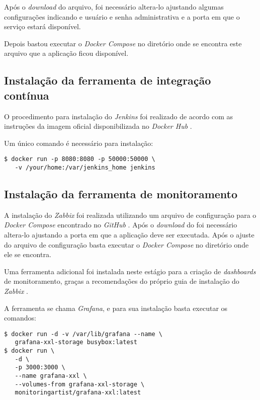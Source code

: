 \documentclass[
	12pt,				%
	openright,			%
	oneside,			%
	a4paper,			%
	english,			%
	french,				%
	spanish,			%
	brazil,				%
	]{abntex2}
\begin{document}
 Após o \textit{download} do arquivo, foi necessário altera-lo ajustando algumas configurações indicando e usuário e senha administrativa e a porta em que o serviço estará disponível.
 
 Depois bastou executar o \textit{Docker Compose} no diretório onde se encontra este arquivo que a aplicação ficou disponível.

\subsection{Instalação da ferramenta de integração contínua}

O procedimento para instalação do \textit{Jenkins} foi realizado de acordo com as instruções da imagem oficial disponibilizada no \textit{Docker Hub} \cite{DockerHub:Jenkins}.

Um único comando é necessário para instalação:

\begin{lstlisting}
$ docker run -p 8080:8080 -p 50000:50000 \
   -v /your/home:/var/jenkins_home jenkins
\end{lstlisting}

\subsection{Instalação da ferramenta de monitoramento}

A instalação do \textit{Zabbix} foi realizada utilizando um arquivo de configuração para o \textit{Docker Compose} encontrado no \textit{GitHub} \cite{GitHub:ZabbixCompose}. Após o \textit{download} do foi necessário altera-lo ajustando a porta em que a aplicação deve ser executada. Após o ajuste do arquivo de configuração basta executar o \textit{Docker Compose} no diretório onde ele se encontra.

Uma ferramenta adicional foi instalada neste estágio para a criação de \textit{dashboards} de monitoramento, graças a recomendações do próprio guia de instalação do \textit{Zabbix} \cite{Zabbix:Dockerized}.

A ferramenta se chama \textit{Grafana}, e para sua instalação basta executar os comandos:

\begin{lstlisting}
$ docker run -d -v /var/lib/grafana --name \
   grafana-xxl-storage busybox:latest
$ docker run \
   -d \
   -p 3000:3000 \
   --name grafana-xxl \
   --volumes-from grafana-xxl-storage \
   monitoringartist/grafana-xxl:latest
\end{lstlisting}
\end{document}
